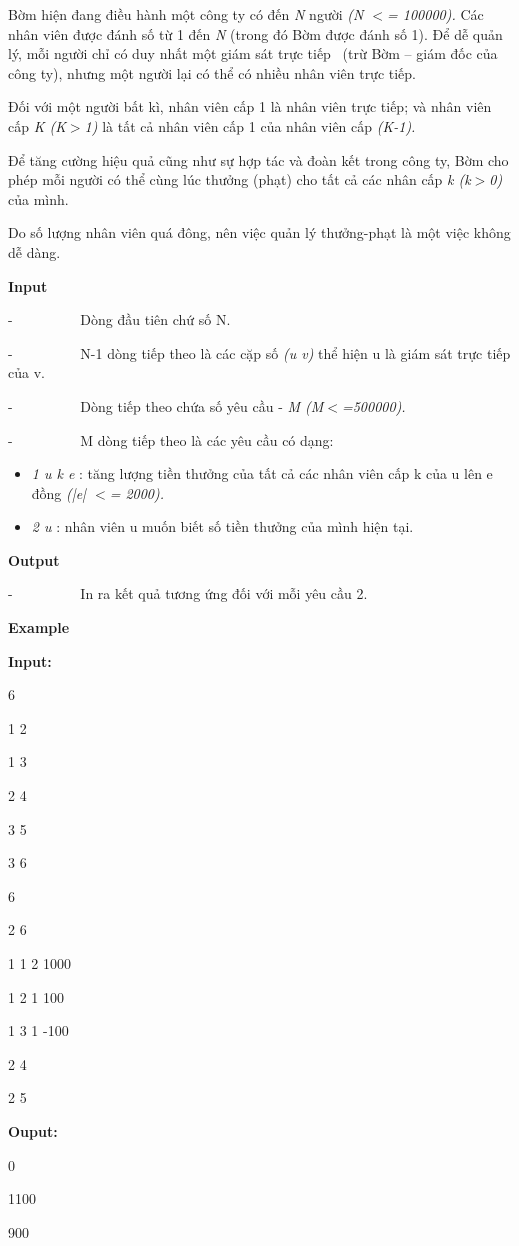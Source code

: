 



   Bờm hiện đang điều hành một công ty có đến   \emph{    N   }   người   \emph{    (N $<$= 100000).   }   Các nhân viên được đánh số từ 1 đến   \emph{    N   }   (trong đó Bờm được đánh số 1). Để dễ quản lý, mỗi người chỉ có duy nhất một giám sát trực tiếp  (trừ Bờm – giám đốc của công ty), nhưng một người lại có thể có nhiều nhân viên trực tiếp.  

   Đối với một người bất kì, nhân viên cấp 1 là nhân viên trực tiếp; và nhân viên cấp   \emph{    K (K$>$1)   }   là tất cả nhân viên cấp 1 của nhân viên cấp   \emph{    (K-1).   }

   Để tăng cường hiệu quả cũng như sự hợp tác và đoàn kết trong công ty, Bờm cho phép mỗi người có thể cùng lúc thưởng (phạt) cho tất cả các nhân cấp   \emph{    k (k$>$0)   }   của mình.  

   Do số lượng nhân viên quá đông, nên việc quản lý thưởng-phạt là một việc không dễ dàng.  

\textbf{    Input   }

   -          Dòng đầu tiên chứ số N.  

   -          N-1 dòng tiếp theo là các cặp số   \emph{    (u v)   }   thể hiện u là giám sát trực tiếp của v.  

   -          Dòng tiếp theo chứa số yêu cầu -   \emph{    M (M$<$=500000).   }

   -          M dòng tiếp theo là các yêu cầu có dạng:  
\begin{itemize}
	\item \emph{     1 u k e    }    : tăng lượng tiền thưởng của tất cả các nhân viên cấp k của u lên e đồng    \emph{     (|e| $<$= 2000).    }
	\item \emph{     2 u    }    : nhân viên u muốn biết số tiền thưởng của mình hiện tại.   
\end{itemize}

\textbf{    Output   }

   -          In ra kết quả tương ứng đối với mỗi yêu cầu 2.  

\textbf{    Example   }

\textbf{    Input:   }

   6  

   1 2  

   1 3  

   2 4  

   3 5  

   3 6  

   6  

   2 6  

   1 1 2 1000  

   1 2 1 100  

   1 3 1 -100  

   2 4  

   2 5  



\textbf{    Ouput:   }

   0  

   1100  

   900  

\textbf{}